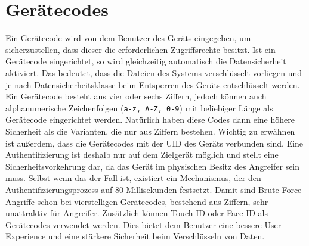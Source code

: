 \section{Gerätecodes}
Ein Gerätecode wird von dem Benutzer des Geräts eingegeben, um sicherzustellen,
dass dieser die erforderlichen Zugriffsrechte besitzt. Ist ein Gerätecode
eingerichtet, so wird gleichzeitig automatisch die Datensicherheit aktiviert.
Das bedeutet, dass die Dateien des Systems verschlüsselt vorliegen und je nach
Datensicherheitsklasse beim Entsperren des Geräts entschlüsselt werden. Ein
Gerätecode besteht aus vier oder sechs Ziffern, jedoch können auch
alphanumerische Zeichenfolgen (\texttt{a-z, A-Z, 0-9}) mit beliebiger Länge als
Gerätecode eingerichtet werden. Natürlich haben diese Codes dann eine höhere
Sicherheit als die Varianten, die nur aus Ziffern bestehen. Wichtig zu erwähnen
ist außerdem, dass die Gerätecodes mit der UID des Geräts verbunden sind. Eine
Authentifizierung ist deshalb nur auf dem Zielgerät möglich und stellt eine
Sicherheitsvorkehrung dar, da das Gerät im physischen Besitz des Angreifer sein
muss. Selbst wenn das der Fall ist, existiert ein Mechanismus, der den
Authentifizierungsprozess auf 80 Millisekunden festsetzt. Damit sind
Brute-Force-Angriffe schon bei vierstelligen Gerätecodes, bestehend aus Ziffern,
sehr unattraktiv für Angreifer. Zusätzlich können Touch ID oder Face ID als
Gerätecodes verwendet werden. Dies bietet dem Benutzer eine bessere
User-Experience und eine stärkere Sicherheit beim Verschlüsseln von Daten.
